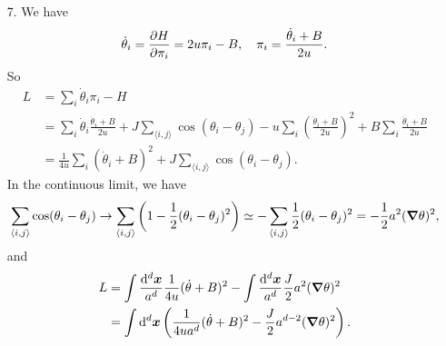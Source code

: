 \documentclass[hyperref, a4paper]{article}
\newcommand*{\pair}[1]{\langle #1 \rangle}
\begin{document}
\begin{itemize}
\item[7.] We have 
\begin{equation}
    \dot{\theta}_i = \pdv{H}{\pi_i} = 2 u \pi_i - B, \quad 
    \pi_i = \frac{\dot{\theta}_i + B}{2u}.
\end{equation}
So
\begin{equation}
    \begin{aligned}
        L &= \sum_i \dot{\theta}_i \pi_i - H \\
        &= \sum_i \dot{\theta}_i \frac{\dot{\theta}_i + B}{2u} 
        + J \sum_{\pair{i, j}} \cos(\theta_i - \theta_j) 
        - u \sum_i \left( \frac{\dot{\theta}_i + B}{2u} \right)^2
        + B \sum_i \frac{\dot{\theta}_i + B}{2u} \\
        &= \frac{1}{4u} \sum_i (\dot{\theta}_i + B)^2 + J \sum_{\pair{i, j}} \cos(\theta_i - \theta_j) .
    \end{aligned}
\end{equation}
In the continuous limit, we have 
\begin{equation}
    \sum_{\pair{i, j}} \cos(\theta_i - \theta_j) 
    \to \sum_{\pair{i, j}} \left( 1 - \frac{1}{2} (\theta_i - \theta_j)^2 \right) 
    \simeq - \sum_{\pair{i, j}} \frac{1}{2} (\theta_i - \theta_j)^2 = - \frac{1}{2} a^2 (\grad{\theta})^2,
\end{equation}
and 
\begin{equation}
    \begin{aligned}
        L &= \int \frac{\dd[d]{\vb*{x}}}{a^d} \frac{1}{4 u} (\dot{\theta} + B)^2 
        - \int \frac{\dd[d]{\vb*{x}}}{a^d} \frac{J}{2} a^2 (\grad{\theta})^2  \\
        &= \int \dd[d]{\vb*{x}} \left(
            \frac{1}{4 u a^d} (\dot{\theta} + B)^2
            - \frac{J}{2} a^{d-2} (\grad{\theta})^2
        \right).
    \end{aligned}
    \label{eq:continuous-eft}
\end{equation}


\end{itemize}
\end{document}
